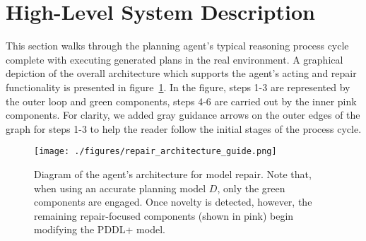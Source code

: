 \documentclass[letterpaper]{article} %
\begin{document}
\section{High-Level System Description}

This section walks through the planning agent's typical reasoning process cycle complete with executing generated plans in the real environment. A graphical depiction of the overall architecture which supports the agent's acting and repair functionality is presented in figure~\ref{fig:repair_architecture}. In the figure, steps 1-3 are represented by the outer loop and green components, steps 4-6 are carried out by the inner pink components. For clarity, we added gray guidance arrows on the outer edges of the graph for steps 1-3 to help the reader follow the initial stages of the process cycle.

\begin{figure}
	\centering
	\texttt{[image: ./figures/repair\_architecture\_guide.png]}
	\caption{Diagram of the agent's architecture for model repair. Note that, when using an accurate planning model $D$, only the green components are engaged. Once novelty is detected, however, the remaining repair-focused components (shown in pink) begin modifying the PDDL+ model.}
	\label{fig:repair_architecture}
\end{figure}
\end{document}
